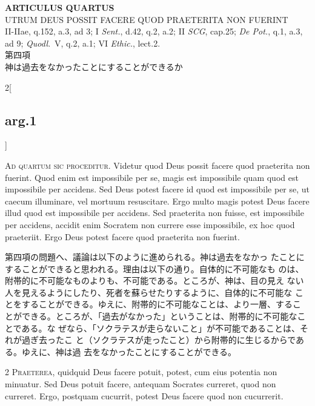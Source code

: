 \documentclass[paper=a4paper,fontsize=10pt,jafontsize=9pt,titlepage]{jlreq}
\begin{document}
\begin{center}
 {\Large {\bfseries ARTICULUS QUARTUS}}\\
 {\large UTRUM DEUS POSSIT FACERE QUOD PRAETERITA NON FUERINT}\\
 {\footnotesize II-IIae, q.152, a.3, ad 3; I {\itshape Sent.}, d.42,
 q.2, a.2; II {\itshape SCG}, cap.25; {\itshape De Pot.}, q.1, a.3, ad
 9; {\itshape Quodl}.~V, q.2, a.1; VI {\itshape Ethic.}, lect.2. }\\
 {\Large 第四項\\神は過去をなかったことにすることができるか}
\end{center}

\begin{paracol}{2}[\subsection{arg.1}]

{\Huge A}{\scshape d quartum sic proceditur}. Videtur quod Deus possit
facere quod praeterita non fuerint. Quod enim est impossibile per se,
magis est impossibile quam quod est impossibile per accidens. Sed Deus
potest facere id quod est impossibile per se, ut caecum illuminare, vel
mortuum resuscitare. Ergo multo magis potest Deus facere illud quod est
impossibile per accidens. Sed praeterita non fuisse, est impossibile per
accidens, accidit enim Socratem non currere esse impossibile, ex hoc
quod praeteriit. Ergo Deus potest facere quod praeterita non fuerint.

\switchcolumn

第四項の問題へ、議論は以下のように進められる。神は過去をなかっ
たことにすることができると思われる。理由は以下の通り。自体的に不可能なも
のは、附帯的に不可能なものよりも、不可能である。ところが、神は、目の見え
ない人を見えるようにしたり、死者を蘇らせたりするように、自体的に不可能な
ことをすることができる。ゆえに、附帯的に不可能なことは、より一層、するこ
とができる。ところが、「過去がなかった」ということは、附帯的に不可能なことである。な
ぜなら、「ソクラテスが走らないこと」が不可能であることは、それが過ぎ去ったこ
と（ソクラテスが走ったこと）から附帯的に生じるからである。ゆえに、神は過
去をなかったことにすることができる。


{\scshape 2 Praeterea}, quidquid Deus facere potuit,
potest, cum eius potentia non minuatur. Sed Deus potuit facere, antequam
Socrates curreret, quod non curreret. Ergo, postquam cucurrit, potest
Deus facere quod non cucurrerit.


\end{paracol}
\end{document}
